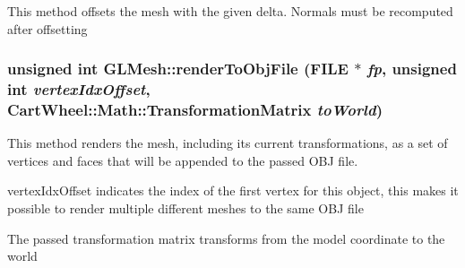 \label{classCartWheel_1_1GL_1_1GLMesh_a596ecf6cf2ece6422ac23d638170e730}
This method offsets the mesh with the given delta. Normals must be recomputed after offsetting \hypertarget{classCartWheel_1_1GL_1_1GLMesh_acb6381163d3348f0983b35b4defb6449}{
\subsubsection[{renderToObjFile}]{\setlength{\rightskip}{0pt plus 5cm}unsigned int GLMesh::renderToObjFile (FILE $\ast$ {\em fp}, \/  unsigned int {\em vertexIdxOffset}, \/  {\bf CartWheel::Math::TransformationMatrix} {\em toWorld})}}
\label{classCartWheel_1_1GL_1_1GLMesh_acb6381163d3348f0983b35b4defb6449}
This method renders the mesh, including its current transformations, as a set of vertices and faces that will be appended to the passed OBJ file.

vertexIdxOffset indicates the index of the first vertex for this object, this makes it possible to render multiple different meshes to the same OBJ file

The passed transformation matrix transforms from the model coordinate to the world

